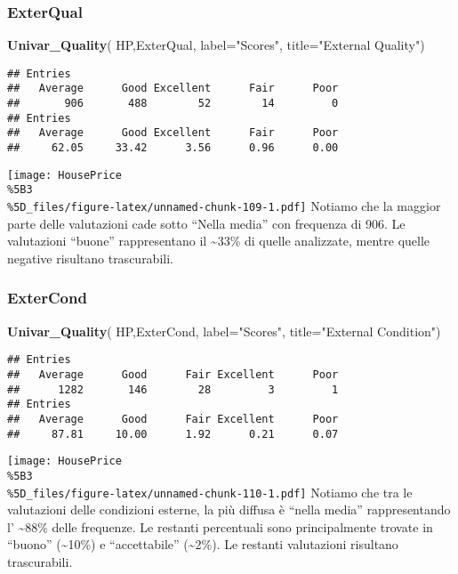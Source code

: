 \documentclass[
]{article}
\newenvironment{Shaded}{\begin{snugshade}}{\end{snugshade}}
\newcommand{\AttributeTok}[1]{\textcolor[rgb]{0.13,0.29,0.53}{#1}}
\newcommand{\FunctionTok}[1]{\textcolor[rgb]{0.13,0.29,0.53}{\textbf{#1}}}
\newcommand{\NormalTok}[1]{#1}
\newcommand{\StringTok}[1]{\textcolor[rgb]{0.31,0.60,0.02}{#1}}
\begin{document}
\subsubsection{ExterQual}\label{exterqual}

\begin{Shaded}
\begin{Highlighting}[]
\FunctionTok{Univar\_Quality}\NormalTok{(}
\NormalTok{  HP,ExterQual,}
  \AttributeTok{label=}\StringTok{"Scores"}\NormalTok{,}
  \AttributeTok{title=}\StringTok{"External Quality"}\NormalTok{)}
\end{Highlighting}
\end{Shaded}

\begin{verbatim}
## Entries
##   Average      Good Excellent      Fair      Poor 
##       906       488        52        14         0 
## Entries
##   Average      Good Excellent      Fair      Poor 
##     62.05     33.42      3.56      0.96      0.00
\end{verbatim}

\texttt{[image: HousePrice\\\%5B3\\\%5D\_files/figure-latex/unnamed-chunk-109-1.pdf]}
Notiamo che la maggior parte delle valutazioni cade sotto ``Nella
media'' con frequenza di 906. Le valutazioni ``buone'' rappresentano il
\textasciitilde33\% di quelle analizzate, mentre quelle negative
risultano trascurabili.

\subsubsection{ExterCond}\label{extercond}

\begin{Shaded}
\begin{Highlighting}[]
\FunctionTok{Univar\_Quality}\NormalTok{(}
\NormalTok{  HP,ExterCond,}
  \AttributeTok{label=}\StringTok{"Scores"}\NormalTok{,}
  \AttributeTok{title=}\StringTok{"External Condition"}\NormalTok{)}
\end{Highlighting}
\end{Shaded}

\begin{verbatim}
## Entries
##   Average      Good      Fair Excellent      Poor 
##      1282       146        28         3         1 
## Entries
##   Average      Good      Fair Excellent      Poor 
##     87.81     10.00      1.92      0.21      0.07
\end{verbatim}

\texttt{[image: HousePrice\\\%5B3\\\%5D\_files/figure-latex/unnamed-chunk-110-1.pdf]}
Notiamo che tra le valutazioni delle condizioni esterne, la più diffusa
è ``nella media'' rappresentando l' \textasciitilde88\% delle frequenze.
Le restanti percentuali sono principalmente trovate in ``buono''
(\textasciitilde10\%) e ``accettabile'' (\textasciitilde2\%). Le
restanti valutazioni risultano trascurabili.
\end{document}
